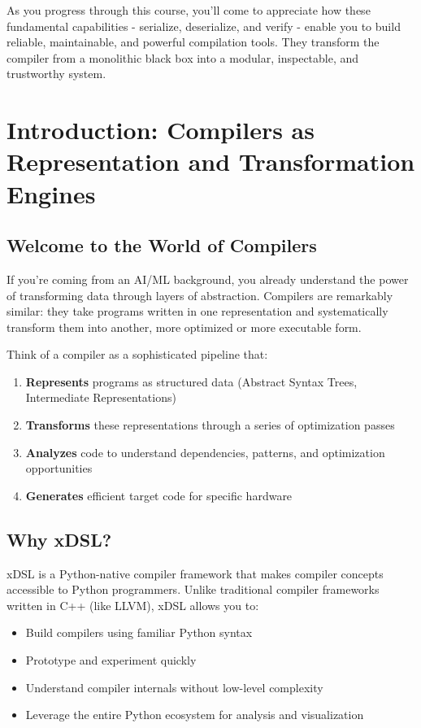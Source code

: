 \documentclass[11pt,a4paper]{article}
\begin{document}
As you progress through this course, you'll come to appreciate how these fundamental capabilities - serialize, deserialize, and verify - enable you to build reliable, maintainable, and powerful compilation tools. They transform the compiler from a monolithic black box into a modular, inspectable, and trustworthy system.

\section{Introduction: Compilers as Representation and Transformation Engines}

\subsection{Welcome to the World of Compilers}

If you're coming from an AI/ML background, you already understand the power of transforming data through layers of abstraction. Compilers are remarkably similar: they take programs written in one representation and systematically transform them into another, more optimized or more executable form.

Think of a compiler as a sophisticated pipeline that:
\begin{enumerate}
    \item \textbf{Represents} programs as structured data (Abstract Syntax Trees, Intermediate Representations)
    \item \textbf{Transforms} these representations through a series of optimization passes
    \item \textbf{Analyzes} code to understand dependencies, patterns, and optimization opportunities
    \item \textbf{Generates} efficient target code for specific hardware
\end{enumerate}

\subsection{Why xDSL?}

xDSL is a Python-native compiler framework that makes compiler concepts accessible to Python programmers. Unlike traditional compiler frameworks written in C++ (like LLVM), xDSL allows you to:
\begin{itemize}
    \item Build compilers using familiar Python syntax
    \item Prototype and experiment quickly
    \item Understand compiler internals without low-level complexity
    \item Leverage the entire Python ecosystem for analysis and visualization
\end{itemize}
\end{document}
